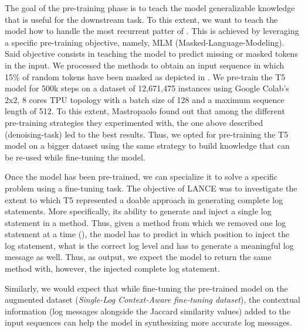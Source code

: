 The goal of the pre-training phase is to teach the model generalizable knowledge that is useful for the downstream task. To this extent, we want to teach the model how to handle the most recurrent patter of \java. This is achieved by leveraging a specific pre-training objective, namely, MLM (Masked-Language-Modeling). Said objective consists in teaching the model to predict missing or masked tokens in the input. We processed the methods to obtain an input sequence in which 15\% of random tokens have been masked as depicted in .
We pre-train the T5 model for 500k steps on a dataset of 12,671,475 instances using Google Colab's 2x2, 8 cores TPU topology with a batch size of 128 and a maximum sequence length of 512.
To this extent, Mastropaolo \etal \cite{mastropaolo2022using} found out that among the different pre-training strategies they experimented with, the one above described (\ie denoising-task) led to the best results. Thus, we opted for pre-training the T5 model on a bigger dataset using the same strategy to build knowledge that can be re-used while fine-tuning the model.

Once the model has been pre-trained, we can specialize it to solve a specific problem using a fine-tuning task. The objective of LANCE \cite{mastropaolo2022using} was to investigate the extent to which  T5 represented a doable approach in generating complete log statements. More specifically, its ability to generate and inject a single log statement in a \java method. Thus, given a \java method from which we removed one log statement at a time  (), the model has to predict in which position to inject the log statement, what is the correct log level and has to generate a meaningful log message as well. Thus, as output, we expect the model to return the same \java method with, however, the injected complete log statement. 

Similarly, we would expect that while fine-tuning the pre-trained model on the augmented dataset (\ie  \textit{Single-Log Context-Aware fine-tuning dataset}), the contextual information (\ie log messages alongside the Jaccard similarity values) added to the input sequences can help the model in synthesizing more accurate log messages.

